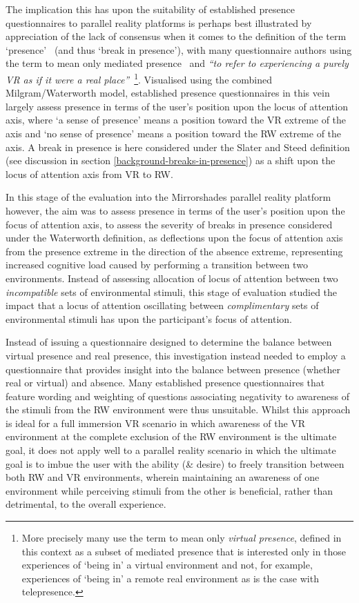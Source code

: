 The implication this has upon the suitability of established presence questionnaires to parallel reality platforms is perhaps best illustrated by appreciation of the lack of consensus when it comes to the definition of the term `presence'~\cite{Calleja2014} (and thus `break in presence'), with many questionnaire authors using the term to mean only mediated presence~\cite{Mantovani2010} and \textit{``to refer to experiencing a purely VR as if it were a real place''}~\cite{Steed2014}\footnote{More precisely many use the term to mean only \textit{virtual presence}, defined in this context as a subset of mediated presence that is interested only in those experiences of `being in' a virtual environment and not, for example, experiences of `being in' a remote real environment as is the case with telepresence.}. Visualised using the combined Milgram/Waterworth model, established presence questionnaires in this vein largely assess presence in terms of the user's position upon the locus of attention axis, where `a sense of presence' means a position toward the VR extreme of the axis and `no sense of presence' means a position toward the RW extreme of the axis. A break in presence is here considered under the Slater and Steed definition (see discussion in section \ref{background-breaks-in-presence}) as a shift upon the locus of attention axis from VR to RW.

In this stage of the evaluation into the Mirrorshades parallel reality platform however, the aim was to assess presence in terms of the user's position upon the focus of attention axis, to assess the severity of breaks in presence considered under the Waterworth definition, as deflections upon the focus of attention axis from the presence extreme in the direction of the absence extreme, representing increased cognitive load caused by performing a transition between two environments. Instead of assessing allocation of locus of attention between two \textit{incompatible} sets of environmental stimuli, this stage of evaluation studied the impact that a locus of attention oscillating between \textit{complimentary} sets of environmental stimuli has upon the participant's focus of attention.

Instead of issuing a questionnaire designed to determine the balance between virtual presence and real presence, this investigation instead needed to employ a questionnaire that provides insight into the balance between presence (whether real or virtual) and absence. Many established presence questionnaires that feature wording and weighting of questions associating negativity to awareness of the stimuli from the RW environment were thus unsuitable. Whilst this approach is ideal for a full immersion VR scenario in which awareness of the VR environment at the complete exclusion of the RW environment is the ultimate goal, it does not apply well to a parallel reality scenario in which the ultimate goal is to imbue the user with the ability (\& desire) to freely transition between both RW and VR environments, wherein maintaining an awareness of one environment while perceiving stimuli from the other is beneficial, rather than detrimental, to the overall experience.

